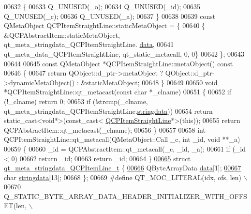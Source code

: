 \begin{DoxyCode}
00632 \{
00633     Q\_UNUSED(\_o);
00634     Q\_UNUSED(\_id);
00635     Q\_UNUSED(\_c);
00636     Q\_UNUSED(\_a);
00637 \}
00638 
00639 \textcolor{keyword}{const} QMetaObject QCPItemStraightLine::staticMetaObject = \{
00640     \{ &QCPAbstractItem::staticMetaObject, qt\_meta\_stringdata\_QCPItemStraightLine.
      \hyperlink{a00067_a86cfd75cdbd69fb7bac81f44368368a2}{data},
00641       qt\_meta\_data\_QCPItemStraightLine,  qt\_static\_metacall, 0, 0\}
00642 \};
00643 
00644 
00645 \textcolor{keyword}{const} QMetaObject *QCPItemStraightLine::metaObject()\textcolor{keyword}{ const}
00646 \textcolor{keyword}{}\{
00647     \textcolor{keywordflow}{return} QObject::d\_ptr->metaObject ? QObject::d\_ptr->dynamicMetaObject() : &staticMetaObject;
00648 \}
00649 
00650 \textcolor{keywordtype}{void} *QCPItemStraightLine::qt\_metacast(\textcolor{keyword}{const} \textcolor{keywordtype}{char} *\_clname)
00651 \{
00652     \textcolor{keywordflow}{if} (!\_clname) \textcolor{keywordflow}{return} 0;
00653     \textcolor{keywordflow}{if} (!strcmp(\_clname, qt\_meta\_stringdata\_QCPItemStraightLine.\hyperlink{a00067_a4fcd4918ec3f5999a6ee9ce08ebcdb96}{stringdata}))
00654         \textcolor{keywordflow}{return} \textcolor{keyword}{static\_cast<}\textcolor{keywordtype}{void}*\textcolor{keyword}{>}(\textcolor{keyword}{const\_cast<} \hyperlink{a00040}{QCPItemStraightLine}*\textcolor{keyword}{>}(\textcolor{keyword}{this}));
00655     \textcolor{keywordflow}{return} QCPAbstractItem::qt\_metacast(\_clname);
00656 \}
00657 
00658 \textcolor{keywordtype}{int} QCPItemStraightLine::qt\_metacall(QMetaObject::Call \_c, \textcolor{keywordtype}{int} \_id, \textcolor{keywordtype}{void} **\_a)
00659 \{
00660     \_id = QCPAbstractItem::qt\_metacall(\_c, \_id, \_a);
00661     \textcolor{keywordflow}{if} (\_id < 0)
00662         \textcolor{keywordflow}{return} \_id;
00663     \textcolor{keywordflow}{return} \_id;
00664 \}
\hypertarget{a00067_source_l00665}{}\hyperlink{a00067}{00665} \textcolor{keyword}{struct }\hyperlink{a00067_dd/de3/a00201}{qt\_meta\_stringdata\_QCPItemLine\_t} \{
\hypertarget{a00067_source_l00666}{}\hyperlink{a00067_a02b269c84618a73b8cefdb4c4ae888c6}{00666}     QByteArrayData \hyperlink{a00067_a02b269c84618a73b8cefdb4c4ae888c6}{data}[1];
\hypertarget{a00067_source_l00667}{}\hyperlink{a00067_ac705c65b9062c112f8ff0dd2a2915160}{00667}     \textcolor{keywordtype}{char} \hyperlink{a00067_ac705c65b9062c112f8ff0dd2a2915160}{stringdata}[13];
00668 \};
00669 \textcolor{preprocessor}{#define QT\_MOC\_LITERAL(idx, ofs, len) \(\backslash\)}
00670 \textcolor{preprocessor}{    Q\_STATIC\_BYTE\_ARRAY\_DATA\_HEADER\_INITIALIZER\_WITH\_OFFSET(len, \(\backslash\)}

\end{DoxyCode}
